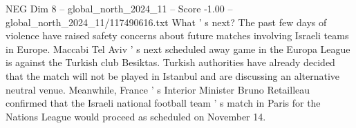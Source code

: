 \begin{textsample}{NEG Dim 8 – global\_north\_2024\_11 – Score -1.00 – global\_north\_2024\_11/117490616.txt}
What ' s next?
The past few days of violence have raised safety concerns about future matches involving Israeli teams in Europe.
Maccabi Tel Aviv ' s next scheduled away game in the Europa League is against the Turkish club Besiktas.
Turkish authorities have already decided that the match will not be played in Istanbul and are discussing an alternative neutral venue.
Meanwhile, France ' s Interior Minister Bruno Retailleau confirmed that the Israeli national football team ' s match in Paris for the Nations League would proceed as scheduled on November 14.

\end{textsample}
